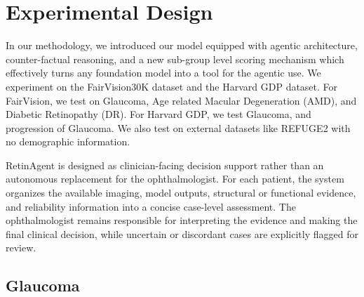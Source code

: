 \section{Experimental Design}\label{sec:experiments}
In our methodology, we introduced our model equipped with agentic architecture, counter-factual reasoning, and a new sub-group level scoring mechanism which effectively turns any foundation model into a tool for the agentic use. We experiment on the FairVision30K dataset and the Harvard GDP dataset. For FairVision, we test on Glaucoma, Age related Macular Degeneration (AMD), and Diabetic Retinopathy (DR). For Harvard GDP, we test Glaucoma, and progression of Glaucoma. We also test on external datasets like REFUGE2 with no demographic information.

RetinAgent is designed as clinician-facing decision support rather than an
autonomous replacement for the ophthalmologist. For each patient, the system
organizes the available imaging, model outputs, structural or functional
evidence, and reliability information into a concise case-level assessment.
The ophthalmologist remains responsible for interpreting the evidence and
making the final clinical decision, while uncertain or discordant cases are
explicitly flagged for review.
\subsection{Glaucoma}

